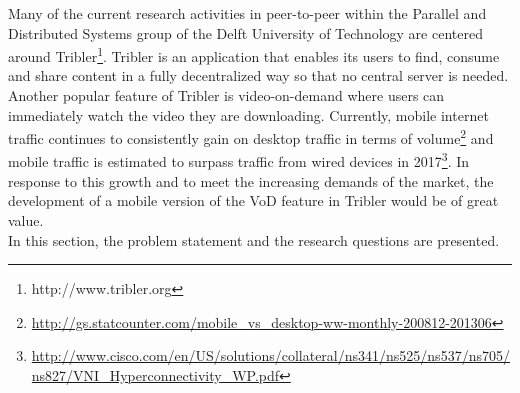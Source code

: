 Many of the current research activities in peer-to-peer within the Parallel and Distributed Systems group of the Delft University of Technology are centered around Tribler\footnote{http://www.tribler.org}. Tribler is an application that enables its users to find, consume and share content in a fully decentralized way so that no central server is needed. Another popular feature of Tribler is video-on-demand where users can immediately watch the video they are downloading. Currently, mobile internet traffic continues to consistently gain on desktop traffic in terms of volume\footnote{\url{http://gs.statcounter.com/mobile\_vs\_desktop-ww-monthly-200812-201306}} and mobile traffic is estimated to surpass traffic from wired devices in 2017\footnote{\url{http://www.cisco.com/en/US/solutions/collateral/ns341/ns525/ns537/ns705/ns827/VNI\_Hyperconnectivity\_WP.pdf}}. In response to this growth and to meet the increasing demands of the market, the development of a mobile version of the VoD feature in Tribler would be of great value.\\
In this section, the problem statement and the research questions are presented.